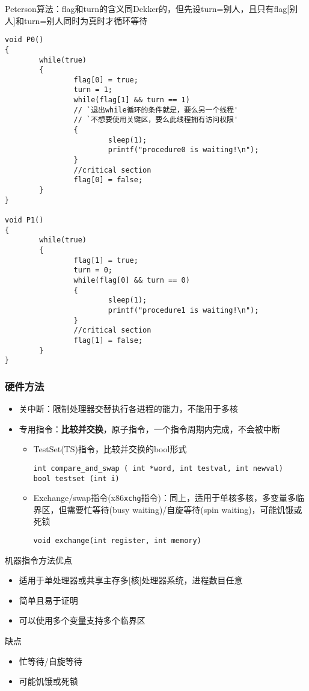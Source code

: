 Peterson算法：flag和turn的含义同Dekker的，但先设turn=别人，且只有flag[别人]和turn=别人同时为真时才循环等待
\begin{lstlisting}
void P0()
{
        while(true)
        {
                flag[0] = true;
                turn = 1;
                while(flag[1] && turn == 1)
                // `退出while循环的条件就是，要么另一个线程'
                // `不想要使用关键区，要么此线程拥有访问权限'
                {
                        sleep(1);
                        printf("procedure0 is waiting!\n");
                }
                //critical section
                flag[0] = false;
        }
}

void P1()
{
        while(true)
        {
                flag[1] = true;
                turn = 0;
                while(flag[0] && turn == 0)
                {
                        sleep(1);
                        printf("procedure1 is waiting!\n");
                }
                //critical section
                flag[1] = false;
        }
}
\end{lstlisting}

\subsubsection{硬件方法}
\begin{itemize}
    \item 关中断：限制处理器交替执行各进程的能力，不能用于多核
    \item 专用指令：\textbf{比较并交换}，原子指令，一个指令周期内完成，不会被中断
    \begin{itemize}
        \item TestSet(TS)指令，比较并交换的bool形式
\begin{lstlisting}
int compare_and_swap ( int *word, int testval, int newval)
bool testset (int i)
\end{lstlisting}
        \item Exchange/swap指令(x86\verb'xchg'指令)：同上，适用于单核多核，多变量多临界区，但需要忙等待(busy waiting)/自旋等待(spin waiting)，可能饥饿或死锁
\begin{lstlisting}
void exchange(int register, int memory)
\end{lstlisting}
    \end{itemize}
\end{itemize}

机器指令方法优点
\begin{itemize}
    \item 适用于单处理器或共享主存多[核]处理器系统，进程数目任意
    \item 简单且易于证明
    \item 可以使用多个变量支持多个临界区
\end{itemize}
缺点
\begin{itemize}
    \item 忙等待/自旋等待
    \item 可能饥饿或死锁
\end{itemize}

